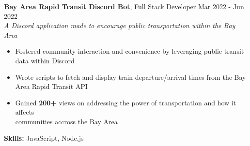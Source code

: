 \documentclass[letterpaper, 10pt]{article}
\newcommand{\secStartSpace}{\vspace{3pt}}
\newcommand{\secEndSpace}{\vspace{5pt}}
\begin{document}



\secStartSpace
\noindent \normalsize \textbf{Bay Area Rapid Transit Discord Bot}, Full Stack Developer \hfill \normalsize{Mar 2022 - Jun 2022}\\
\textit{A Discord application made to encourage public transportation within the Bay Area}
\setlength \parindent{1cm} 
    \vspace{-5pt}
    \noindent \hspace{-10pt} \begin{itemize} 
        \item Fostered community interaction and convenience by leveraging public transit data within Discord
        \vspace{-6pt}
        \item Wrote scripts to fetch and display train departure/arrival times from the Bay Area Rapid Transit API
        \vspace{-6pt}
        \item Gained \textbf{200+} views on \href{https://youtu.be/ONF2q3rHjRI?si=9Lg-JaIrbQBwhoAw}{\color{blue}{YouTube}} addressing the power of transportation and how it affects\\
        communities accross the Bay Area
    \end{itemize}
    \vspace{-5pt} \hspace{0pt}
    \textbf{Skills:}  JavaScript, Node.js
\secEndSpace
\end{document}
